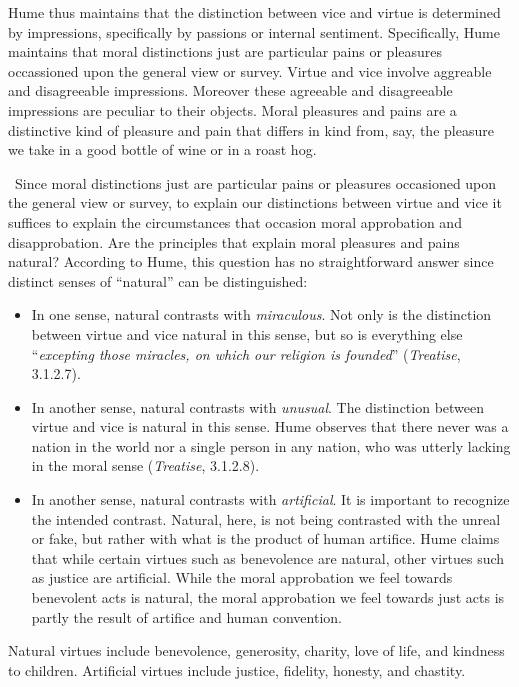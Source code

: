 Hume thus maintains that the distinction between vice and virtue is determined by impressions, specifically by passions or internal sentiment. Specifically, Hume maintains that moral distinctions just are particular pains or pleasures occassioned upon the general view or survey. Virtue and vice involve aggreable and disagreeable impressions. Moreover these agreeable and disagreeable impressions are peculiar to their objects. Moral pleasures and pains are a distinctive kind of pleasure and pain that differs in kind from, say, the pleasure we take in a good bottle of wine or in a roast hog. 

\change\ Since moral distinctions just are particular pains or pleasures occasioned upon the general view or survey, to explain our distinctions between virtue and vice it suffices to explain the circumstances that occasion moral approbation and disapprobation. Are the principles that explain moral pleasures and pains natural? According to Hume, this question has no straightforward answer since distinct senses of ``natural'' can be distinguished:

\begin{itemize}
    \item In one sense, natural contrasts with \emph{miraculous}. Not only is the distinction between virtue and vice natural in this sense, but so is everything else ``\emph{excepting those miracles, on which our religion is founded}'' (\emph{Treatise}, 3.1.2.7).
    \item In another sense, natural contrasts with \emph{unusual}. The distinction between virtue and vice is natural in this sense. Hume observes that there never was a nation in the world nor a single person in any nation, who was utterly lacking in the moral sense (\emph{Treatise}, 3.1.2.8).
    \item In another sense, natural contrasts with \emph{artificial}. It is important to recognize the intended contrast. Natural, here, is not being contrasted with the unreal or fake, but rather with what is the product of human artifice. Hume claims that while certain virtues such as benevolence are natural, other virtues such as justice are artificial. While the moral approbation we feel towards benevolent acts is natural, the moral approbation we feel towards just acts is partly the result of artifice and human convention.
\end{itemize}

Natural virtues include benevolence, generosity, charity, love of life, and kindness to children. Artificial virtues include justice, fidelity, honesty, and chastity. \change

